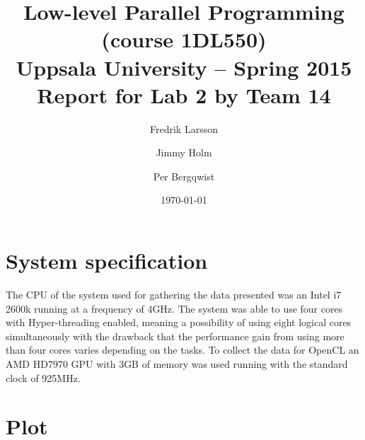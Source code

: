 \documentclass[a4paper,11pt]{article}
\title{\textbf{Low-level Parallel Programming (course 1DL550) \\
    Uppsala University -- Spring 2015 \\
    Report for Lab 2 by Team 14}}
\author{Fredrik Larsson \and Jimmy Holm \and Per Bergqwist}
\date{\today}
\begin{document}
\maketitle
\section{System specification}
The CPU of the system used for gathering the data presented was an
Intel i7 2600k running at a frequency of 4GHz. The system was able to
use four cores with Hyper-threading enabled, meaning a possibility of
using eight logical cores simultaneously with the drawback that the
performance gain from using more than four cores varies depending on
the tasks. To collect the data for OpenCL an AMD HD7970 GPU with 3GB
of memory was used running with the standard clock of 925MHz.
\section{Plot}
\end{document}
